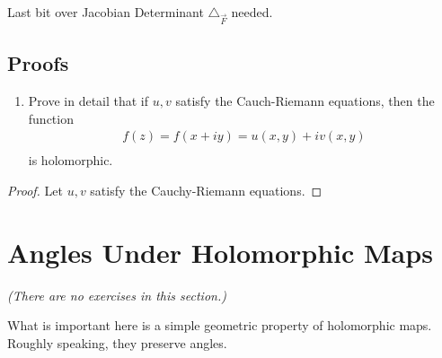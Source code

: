 Last bit over Jacobian Determinant $\triangle_{\vec{F}}$ needed.

\subsection{Proofs}
\begin{enumerate}
	\item Prove in detail that if $u, v$ satisfy the Cauch-Riemann equations, then the function
	\begin{align*}
		f(z) = f(x + iy) = u(x, y) + iv(x, y) \\
	\end{align*}
	is holomorphic.
\end{enumerate}
\begin{proof}
	Let $u,v$ satisfy the Cauchy-Riemann equations.
\end{proof}

\section{Angles Under Holomorphic Maps}
\textit{(There are no exercises in this section.)}

What is important here is a simple geometric property of holomorphic maps. Roughly speaking, they preserve angles.

